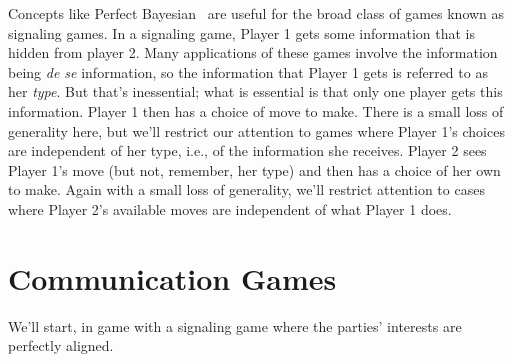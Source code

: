 Concepts like Perfect Bayesian \eqm\ are useful for the broad class of games known as signaling games. In a signaling game, Player 1 gets some information that is hidden from player 2. Many applications of these games involve the information being \textit{de se} information, so the information that Player 1 gets is referred to as her \textit{type}. But that's inessential; what is essential is that only one player gets this information. Player 1 then has a choice of move to make. There is a small loss of generality here, but we'll restrict our attention to games where Player 1's choices are independent of her type, i.e., of the information she receives. Player 2 sees Player 1's move (but not, remember, her type) and then has a choice of her own to make. Again with a small loss of generality, we'll restrict attention to cases where Player 2's available moves are independent of what Player 1 does. 

\section{Communication Games}

We'll start, in game  with a signaling game where the parties' interests are perfectly aligned.

